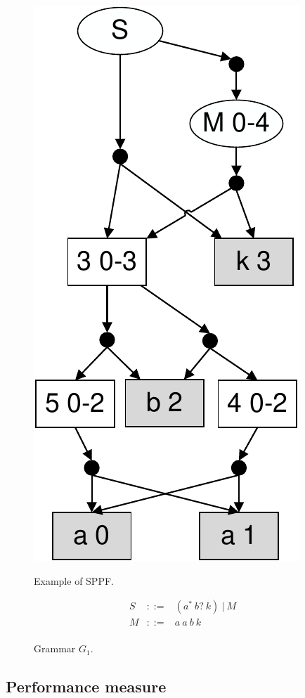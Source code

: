 \documentclass[runningheads,a4paper]{llncs}
\begin{document}
\begin{figure}[H]
{        \includegraphics[scale=.65]{pictures/SPPFforG1.pdf}
        \label{fig:SPPFForG1}
    }
    \caption{Example of SPPF.}
\end{figure}

\begin{figure}[H]
    $$
    \begin{array}{crcl}
    S& ::= &(a^{*}\ b?\ k)\ |\ M \\
    M& ::= &a\ a\ b\ k \\
    \end{array}
    $$
    \caption{Grammar $G_1$.}
    \label{fig:grammarG1}
\end{figure}

\subsection{Performance measure}
\end{document}
